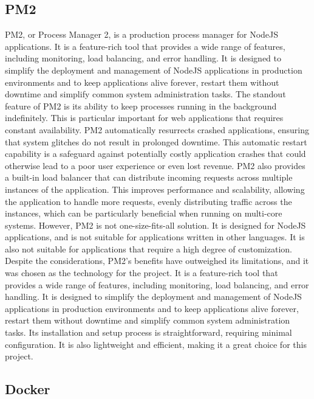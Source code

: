 \subsection{PM2}
PM2, or Process Manager 2, is a production process manager for NodeJS applications. It is a feature-rich tool that provides a wide range of features, including monitoring, load balancing, and error handling. It is designed to simplify the deployment and management of NodeJS applications in production environments and to keep applications alive forever, restart
them without downtime and simplify common system administration tasks.
The standout feature of PM2 is its ability to keep processes running in the background indefinitely. This is particular important for web applications that requires constant availability. PM2 automatically resurrects crashed applications, ensuring that system glitches do not result in prolonged downtime.\cite{pm2}
This automatic restart capability is a safeguard against potentially costly application crashes that could otherwise lead to a poor user experience or even lost revenue. \cite{pm2}
PM2 also provides a built-in load balancer that can distribute incoming requests across multiple instances of the application. This improves performance and scalability, allowing the application to handle more requests, evenly distributing traffic across the instances, which can be particularly beneficial when running on multi-core systems. \cite{pm2LoadBalancing}
However, PM2 is not one-size-fits-all solution. It is designed for NodeJS applications, and is not suitable for applications written in other languages. It is also not suitable for applications that require a high degree of customization. \cite{pm2}
Despite the considerations, PM2's benefits have outweighed its limitations, and it was chosen as the technology for the project. It is a feature-rich tool that provides a wide range of features, including monitoring, load balancing, and error handling.
It is designed to simplify the deployment and management of NodeJS applications in production environments and to keep applications alive forever, restart them without downtime and simplify common system administration tasks.
Its installation and setup process is straightforward, requiring minimal configuration. It is also lightweight and efficient, making it a great choice for this project. \cite{tilkov}

\subsection{Docker}

